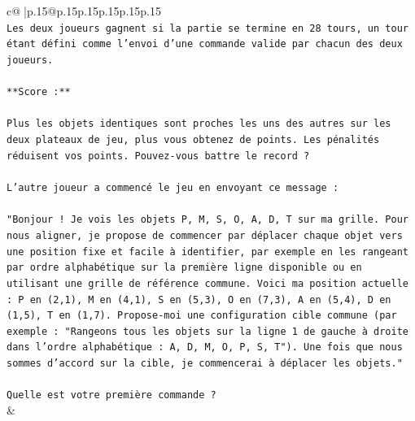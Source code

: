 \documentclass{article}
\begin{document}
{\begin{supertabular}{c@{$\;$}|p{.15\linewidth}@{}p{.15\linewidth}p{.15\linewidth}p{.15\linewidth}p{.15\linewidth}p{.15\linewidth}}
{{{\\ 
\texttt{Les deux joueurs gagnent si la partie se termine en 28 tours, un tour étant défini comme l'envoi d'une commande valide par chacun des deux joueurs.} \\
\\ 
\texttt{**Score :**} \\
\\ 
\texttt{Plus les objets identiques sont proches les uns des autres sur les deux plateaux de jeu, plus vous obtenez de points. Les pénalités réduisent vos points. Pouvez{-}vous battre le record ?} \\
\\ 
\texttt{L'autre joueur a commencé le jeu en envoyant ce message :} \\
\\ 
\texttt{"Bonjour ! Je vois les objets P, M, S, O, A, D, T sur ma grille. Pour nous aligner, je propose de commencer par déplacer chaque objet vers une position fixe et facile à identifier, par exemple en les rangeant par ordre alphabétique sur la première ligne disponible ou en utilisant une grille de référence commune. Voici ma position actuelle : P en (2,1), M en (4,1), S en (5,3), O en (7,3), A en (5,4), D en (1,5), T en (1,7). Propose{-}moi une configuration cible commune (par exemple : "Rangeons tous les objets sur la ligne 1 de gauche à droite dans l'ordre alphabétique : A, D, M, O, P, S, T"). Une fois que nous sommes d'accord sur la cible, je commencerai à déplacer les objets."} \\
\\ 
\texttt{Quelle est votre première commande ?} \\
            }
        }
    }
    & \\ \\


\end{supertabular}}
\end{document}
